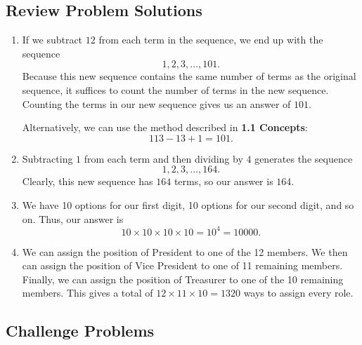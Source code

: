 \documentclass[12pt, letterpaper]{article}
\begin{document}
\newpage
\subsection{Review Problem Solutions}

\begin{enumerate}
    \item If we subtract $12$ from each term in the sequence, we end up with the sequence
    $$1, 2, 3,\ldots,101.$$
    Because this new sequence contains the same number of terms as the original sequence, it suffices
    to count the number of terms in the new sequence. Counting the terms in our new sequence gives us an answer of $\boxed{101}$.
    
    Alternatively, we can use the method described in \textbf{1.1 Concepts}:
    $$113 - 13 + 1 = \boxed{101}.$$
    \item Subtracting $1$ from each term and then dividing by $4$ generates the sequence
    $$1, 2, 3,\ldots, 164.$$
    Clearly, this new sequence has $164$ terms, so our answer is $\boxed{164}$.
    \item We have 10 options for our first digit, 10 options for our second digit, and so on. Thus, our answer is
    $$10 \times 10 \times 10 \times 10 = 10^4 = \boxed{10000}.$$
    \item We can assign the position of President to one of the 12 members. We then can assign the position of Vice President to one of 11 remaining members. Finally, we can assign the position of Treasurer to one of the 10 remaining members. This gives a total of $12 \times 11 \times 10 = \boxed{1320}$ ways to assign every role.
\end{enumerate}

\subsection{Challenge Problems}
\end{document}
